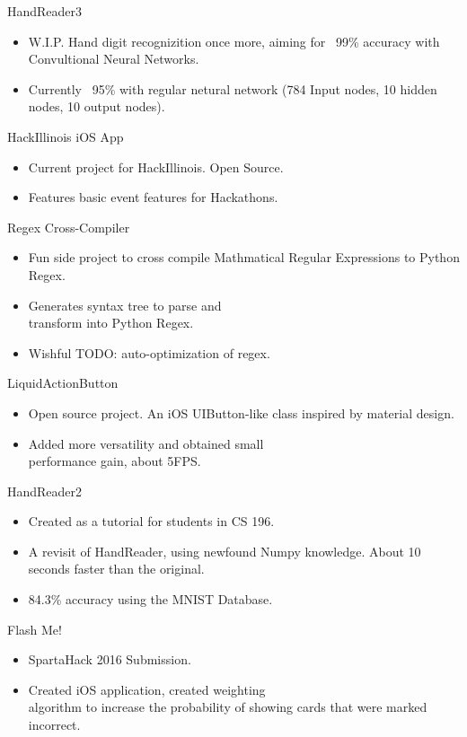 \documentclass{tccv}
\begin{document}
\begin{projectlist}

  {HandReader3}
  \begin{itemize}
  \item W.I.P. Hand digit recognizition once more, aiming for ~99\% accuracy with Convultional Neural Networks.
  \item Currently ~95\% with regular netural network (784 Input nodes, 10 hidden nodes, 10 output nodes).
  \end{itemize}

  {HackIllinois iOS App}

  \begin{itemize}
  \item Current project for HackIllinois. Open Source.
  \item Features basic event features for Hackathons.
  \end{itemize}

  {Regex Cross-Compiler}
  \begin{itemize}
  \item Fun side project to cross compile Mathmatical Regular Expressions to Python Regex.
  \item Generates syntax tree to parse and \\
    transform into Python Regex.
  \item Wishful TODO: auto-optimization of regex.

  \end{itemize}
  {LiquidActionButton}
  \begin{itemize}
  \item Open source project. An iOS UIButton-like class inspired by material design.
  \item Added more versatility and obtained small \\
    performance gain, about 5FPS.
  \end{itemize}

  {HandReader2}
  \begin{itemize}
  \item Created as a tutorial for students in CS 196.
  \item A revisit of HandReader, using newfound Numpy knowledge. About 10 seconds faster than the original.
  \item 84.3\% accuracy using the MNIST Database.
  \end{itemize}

  {Flash Me!}
  \begin{itemize}
  \item SpartaHack 2016 Submission.
  \item Created iOS application, created weighting \\
    algorithm to increase the probability of showing cards that were marked incorrect.
  \end{itemize}


\end{projectlist}
\end{document}
